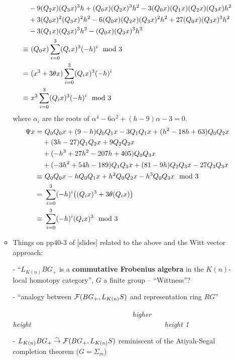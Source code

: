 \documentclass{rs}
\theoremstyle{definition}
\theoremstyle{remark}
\newcommand{\md}{~~{\rm mod}~}
\newcommand{\A}{\alpha}
\renewcommand{\=}{\approx}
\renewcommand{\-}{\sim}
\numberwithin{equation}{section}
\numberwithin{thm}{section}
\begin{document}
\begin{enumerate}
\begin{itemize}
\begin{equation*}
\begin{split}
         & - 9 (Q_2 x) (Q_3 x)^3 h + (Q_0 x) (Q_2 x)^3 h^2 - 3 (Q_0 x) (Q_1 x) (Q_2 x) (Q_3 x) h^2 \\
         & + 3 (Q_0 x)^2 (Q_3 x)^2 h^2 - 6 (Q_0 x) (Q_2 x) (Q_3 x)^2 h^2 + 27 (Q_0 x) (Q_3 x)^3 h^2 \\
         & - 3 (Q_1 x) (Q_3 x)^3 h^2 - (Q_0 x) (Q_3 x)^3 h^3 \\
  \equiv & ~ (Q_0 x) \sum_{i=0}^3 (Q_i x)^3 (-h)^i \md 3 \\
       = & ~ (x^3 + 3 \theta x) \sum_{i=0}^3 (Q_i x)^3 (-h)^i \\
  \equiv & ~ x^3 \sum_{i=0}^3 (Q_i x)^3 (-h)^i \md 3 
  \end{split}
  \end{equation*}
  where $\A_i$ are the roots of $\A^4 - 6 \A^2 + (h - 9) \A - 3 = 0$.  
  \begin{equation*}
  \begin{split}
   \Psi x = & ~ Q_0 Q_0 x + (9 - h) Q_0 Q_1 x - 3 Q_1 Q_1 x + (h^2 - 18 h + 63) Q_0 Q_2 x \\
            & + (3 h - 27) Q_1 Q_2 x + 9 Q_2 Q_2 x \\
            & + (-h^3 + 27 h^2 - 207 h + 405) Q_0 Q_3 x \\
            & + (-3 h^2 + 54 h - 189) Q_1 Q_3 x + (81 - 9 h) Q_2 Q_3 x - 27 Q_3 Q_3 x \\
     \equiv & ~ Q_0 Q_0 x - h Q_0 Q_1 x + h^2 Q_0 Q_2 x - h^3 Q_0 Q_3 x \md 3 \\
          = & ~ \sum_{i=0}^3 (-h)^i \big( (Q_i x)^3 + 3 \theta (Q_i x) \big) \\
     \equiv & ~ \sum_{i=0}^3 (-h)^i (Q_i x)^3 \md 3 
  \end{split}
  \end{equation*}

  \item Things on pp40-3 of [slides] related to the above and the Witt vector approach:

  - ``$L_{K(n)} BG_+$ is a \textbf{commutative Frobenius algebra} in the $K(n)$-local homotopy category'', $G$ a finite group -- ``Wittness''?

  - ``analogy between ${\cal F}(BG_+, L_{K(n)} S)$ and representation ring $RG$''

  ~~~~~~~~~~~~~~~~~~~~~~~~~~~~~~~~~~{\em higher height}~~~~~~~~~~~~~~~~~~~~~~~~~~~~~~~~~~~~~~{\em height 1}

  - $L_{K(n)} BG_+ \stackrel{\sim}{\to} {\cal F}(BG_+, L_{K(n)} S)$ reminiscent of the Atiyah-Segal completion theorem ($G = \Sigma_m$)


\end{itemize}
\end{enumerate}
\end{document}
